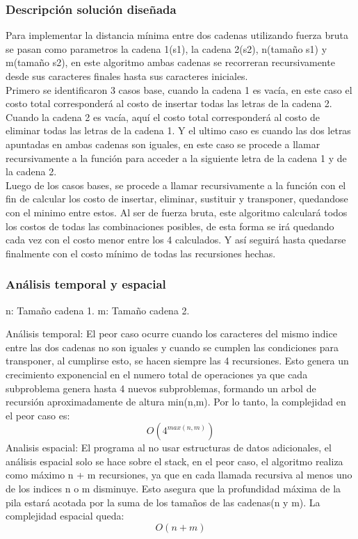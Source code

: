 \subsubsection{Descripción solución diseñada}
Para implementar la distancia mínima entre dos cadenas utilizando fuerza bruta se pasan como parametros la cadena 1(s1), la cadena 2(s2), n(tamaño s1) y m(tamaño s2), en este algoritmo ambas cadenas se recorreran recursivamente desde sus caracteres finales hasta sus caracteres iniciales. \\
Primero se identificaron 3 casos base, cuando la cadena 1 es vacía, en este caso el costo total corresponderá al costo de insertar todas las letras de la cadena 2.
Cuando la cadena 2 es vacía, aquí el costo total corresponderá al costo de eliminar todas las letras de la cadena 1.
Y el ultimo caso es cuando las dos letras apuntadas en ambas cadenas son iguales, en este caso se procede a llamar recursivamente a la función para acceder a la siguiente letra de la cadena 1 y de la cadena 2.\\
Luego de los casos bases, se procede a llamar recursivamente a la función con el fin de calcular los costo de insertar, eliminar, sustituir y transponer, quedandose con el minimo entre estos. 
Al ser de fuerza bruta, este algoritmo calculará todos los costos de todas las combinaciones posibles, de esta forma se irá quedando cada vez con el costo menor entre los 4 calculados. Y así seguirá hasta quedarse finalmente con el costo mínimo de todas las recursiones hechas.
\subsubsection{Análisis temporal y espacial}
n: Tamaño cadena 1.
m: Tamaño cadena 2.

Análisis temporal: El peor caso ocurre cuando los caracteres del mismo indice entre las dos cadenas no son iguales y cuando se cumplen las condiciones para transponer, al cumplirse esto, se hacen siempre las 4 recursiones. Esto genera un crecimiento exponencial en el numero total de operaciones ya que cada subproblema genera hasta 4 nuevos subproblemas, formando un arbol de recursión aproximadamente de altura min(n,m). Por lo tanto, la complejidad en el peor caso es:
\[O(4^{max(n,m)})\]
Analisis espacial: El programa al no usar estructuras de datos adicionales, el análisis espacial solo se hace sobre el stack, en el peor caso, el algoritmo realiza como máximo n + m recursiones, ya que en cada llamada recursiva al menos uno de los indices n o m disminuye. Esto asegura que la profundidad máxima de la pila estará acotada por la suma de los tamaños de las cadenas(n y m). La complejidad espacial queda:
\[O(n+m)\]

